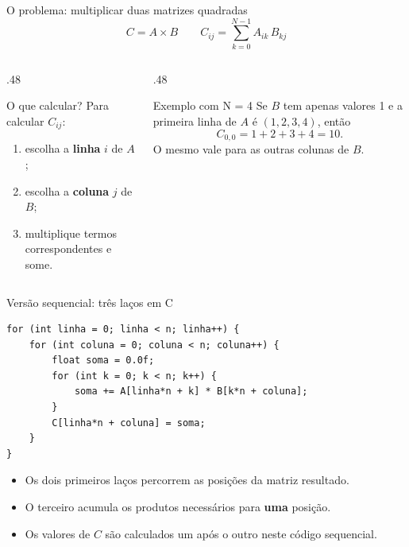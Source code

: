 \documentclass[aspectratio=169,11pt]{beamer}
\begin{document}
\begin{frame}{O problema: multiplicar duas matrizes quadradas}
\centering
\[\boxed{C=A\times B}\qquad C_{ij}=\sum_{k=0}^{N-1} A_{ik}\,B_{kj}\]
\vspace{1mm}
\begin{columns}[T]
\begin{column}{.48\linewidth}
\begin{block}{O que calcular?}
Para calcular \(C_{ij}\):
\begin{enumerate}
\item escolha a \textbf{linha} \(i\) de \(A\);
\item escolha a \textbf{coluna} \(j\) de \(B\);
\item multiplique termos correspondentes e some.
\end{enumerate}
\end{block}
\end{column}
\begin{column}{.48\linewidth}
\begin{exampleblock}{Exemplo com N = 4}
Se \(B\) tem apenas valores 1 e a primeira linha de \(A\) é \((1,2,3,4)\), então
\[C_{0,0}=1+2+3+4=10.\]
O mesmo vale para as outras colunas de \(B\).
\end{exampleblock}
\end{column}
\end{columns}
\end{frame}

\begin{frame}[fragile]{Versão sequencial: três laços em C}
\begin{lstlisting}[style=prog]
for (int linha = 0; linha < n; linha++) {
    for (int coluna = 0; coluna < n; coluna++) {
        float soma = 0.0f;
        for (int k = 0; k < n; k++) {
            soma += A[linha*n + k] * B[k*n + coluna];
        }
        C[linha*n + coluna] = soma;
    }
}
\end{lstlisting}
\begin{itemize}
\item Os dois primeiros laços percorrem as posições da matriz resultado.
\item O terceiro acumula os produtos necessários para \textbf{uma} posição.
\item Os valores de \(C\) são calculados um após o outro neste código sequencial.
\end{itemize}
\end{frame}
\end{document}
